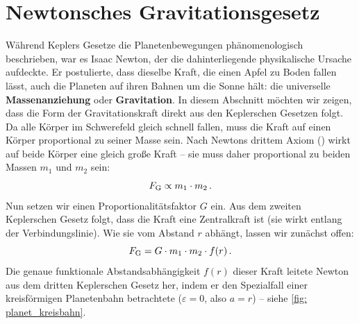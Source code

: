 \section{Newtonsches Gravitationsgesetz}\label{sec: newton_gravitation}
Während Keplers Gesetze die Planetenbewegungen phänomenologisch beschrieben, war es Isaac Newton, der die dahinterliegende physikalische Ursache aufdeckte. Er postulierte, dass dieselbe Kraft, die einen Apfel zu Boden fallen lässt, auch die Planeten auf ihren Bahnen um die Sonne hält: die universelle \textbf{Massenanziehung} oder \textbf{Gravitation}. In diesem Abschnitt möchten wir zeigen, dass die Form der Gravitationskraft direkt aus den Keplerschen Gesetzen folgt.\\ 

Da alle Körper im Schwerefeld gleich schnell fallen, muss die Kraft auf einen Körper proportional zu seiner Masse sein. Nach Newtons drittem Axiom () wirkt auf beide Körper eine gleich große Kraft -- sie muss daher proportional zu beiden Massen $m_1$ und $m_2$ sein: 
\begin{equation}
    F_{\text{G}} \propto m_1 \cdot m_2 \,.
\end{equation}
Nun setzen wir einen Proportionalitätsfaktor $G$ ein. Aus dem zweiten Keplerschen Gesetz folgt, dass die Kraft eine Zentralkraft ist (sie wirkt entlang der Verbindungslinie). Wie sie vom Abstand $r$ abhängt, lassen wir zunächst offen: 
\begin{equation}
    F_{\text{G}} = G \cdot m_1 \cdot m_2 \cdot f(r) \,.
\end{equation}
Die genaue funktionale Abstandsabhängigkeit $f(r)$ dieser Kraft leitete Newton aus dem dritten Keplerschen Gesetz her, indem er den Spezialfall einer kreisförmigen Planetenbahn betrachtete ($\varepsilon=0$, also $a=r$) -- siehe \cref{fig: planet_kreisbahn}. 
